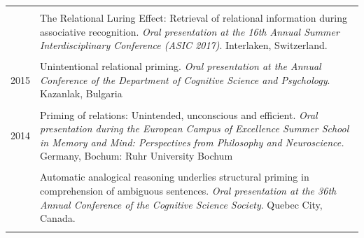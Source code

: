 \documentclass[letterpaper]{article}
\begin{document}
\begin{longtable}{p{0.7cm}p{15cm}}
  &                                                                                                                                                                                                                                                        \\
  & The Relational Luring Effect: Retrieval of relational information during associative recognition. {\it Oral presentation at the 16th Annual Summer Interdisciplinary Conference (ASIC 2017)}. Interlaken, Switzerland.                                 \\[6pt]
  &                                                                                                                                                                                                                                                        \\
  2015 & Unintentional relational priming. {\it Oral presentation at the Annual Conference of the Department of Cognitive Science and Psychology}. Kazanlak, Bulgaria                                                                                           \\[6pt]
  &                                                                                                                                                                                                                                                        \\
  2014 & Priming of relations: Unintended, unconscious and efficient. {\it Oral presentation during the European Campus of Excellence Summer School in Memory and Mind: Perspectives from Philosophy and Neuroscience.} Germany, Bochum: Ruhr University Bochum \\[6pt]
  &                                                                                                                                                                                                                                                        \\
  & Automatic analogical reasoning underlies structural priming in comprehension of ambiguous sentences. {\it Oral presentation at the 36th Annual Conference of the Cognitive Science Society}. Quebec City, Canada.                                      \\[6pt]
  &                                                                                                                                                                                                                                                        \\

\end{longtable}
\end{document}
